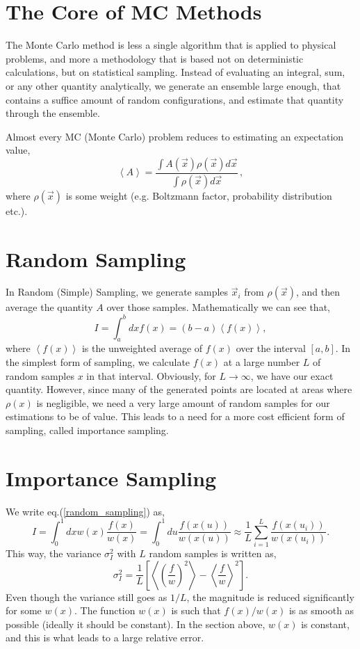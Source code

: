 \documentclass{book}
\begin{document}
	\section{The Core of MC Methods}
	The Monte Carlo method is less a single algorithm that is applied to physical problems, and more a methodology that is based not on deterministic calculations, but on statistical sampling. Instead of evaluating an integral, sum, or any other quantity analytically, we generate an ensemble large enough, that contains a suffice amount of random configurations, and estimate that quantity through the ensemble.
	
	Almost every MC (Monte Carlo) problem reduces to estimating an expectation value,
	\begin{equation}
		\label{mc_sampling}
		\left\langle A \right\rangle = \frac{\int A(\vec x) \rho (\vec x) d \vec x}{\int \rho (\vec x) d \vec x } \, ,
	\end{equation}
	where $\rho(\vec x)$ is some weight (e.g. Boltzmann factor, probability distribution etc.). 
		\section{Random Sampling}
	In Random (Simple) Sampling, we generate samples $\vec x_i$ from $\rho(\vec x)$, and then average the quantity $A$ over those samples. Mathematically we can see that,
	\begin{equation}
		\label{random_sampling}
		I=\int_{a}^{b} dx f(x)=(b-a)\left\langle f(x) \right\rangle,
	\end{equation}
	where $\left\langle f(x) \right\rangle$ is the unweighted average of $f(x)$ over the interval $[a,b]$. In the simplest form of sampling, we calculate $f(x)$ at a large number $L$ of random samples $x$ in that interval. Obviously, for $L\rightarrow\infty$, we have our exact quantity. However, since many of the generated points are located at areas where $\rho(x)$ is negligible, we need a very large amount of random samples for our estimations to be of value. This leads to a need for a more cost efficient form of sampling, called importance sampling.
	\section{Importance Sampling}
	We write eq.(\ref{random_sampling}) as,
	\begin{equation}
		\label{importance_sampling_1}
		I=\int_{0}^{1} dx w(x)\frac{f(x)}{w(x)}=\int_{0}^{1}du \frac{f(x(u))}{w(x(u))}\approx \frac{1}{L}\sum_{i=1}^{L}\frac{f(x(u_i))}{w(x(u_i))}.
	\end{equation} 
	This way, the variance $\sigma^2_I$ with $L$ random samples is written as,
	\begin{equation}
		\label{variance_importance_sampling}
		\sigma^2_I=\frac{1}{L}\left[ \left\langle \left( \frac{f}{w} \right)^2 \right\rangle -\left\langle  \frac{f}{w} \right\rangle ^2 \right].
	\end{equation}
	Even though the variance still goes as $1/L$, the magnitude is reduced significantly for some $w(x)$. The function $w(x)$ is such that $f(x)/w(x)$ is as smooth as possible (ideally it should be constant). In the section above, $w(x)$ is constant, and this is what leads to a large relative error.
\end{document}
